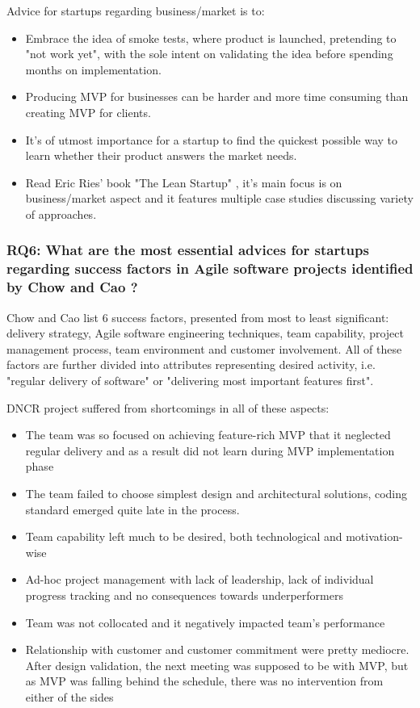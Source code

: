 \documentclass{article}
\begin{document}
Advice for startups regarding business/market is to:
\begin{itemize}
\item Embrace the idea of smoke tests, where product is launched, pretending to "not work yet", with the sole intent on validating the idea before spending months on implementation.
\item Producing MVP for businesses can be harder and more time consuming than creating MVP for clients.
\item It's of utmost importance for a startup to find the quickest possible way to learn whether their product answers the market needs.
\item Read Eric Ries' book "The Lean Startup" \cite{ries2011lean}, it's main focus is on business/market aspect and it features multiple case studies discussing variety of approaches.
\end{itemize}

\subsubsection{RQ6: What are the most essential advices for startups regarding success factors in Agile software projects identified by Chow and Cao \cite{cao2008Agile}?}
Chow and Cao list 6 success factors, presented from most to least significant: delivery strategy, Agile software engineering techniques, team capability, project management process, team environment and customer involvement. All of these factors are further divided into attributes representing desired activity, i.e. "regular delivery of software" or "delivering most important features first".

DNCR project suffered from shortcomings in all of these aspects:
\begin{itemize}
\item The team was so focused on achieving feature-rich MVP that it neglected regular delivery and as a result did not learn during MVP implementation phase
\item The team failed to choose simplest design and architectural solutions, coding standard emerged quite late in the process.
\item Team capability left much to be desired, both technological and motivation-wise
\item Ad-hoc project management with lack of leadership, lack of individual progress tracking and no consequences towards underperformers
\item Team was not collocated and it negatively impacted team's performance
\item Relationship with customer and customer commitment were pretty mediocre. After design validation, the next meeting was supposed to be with MVP, but as MVP was falling behind the schedule, there was no intervention from either of the sides
\end{itemize}
\end{document}
